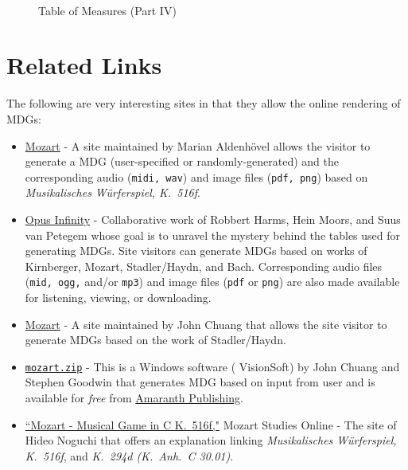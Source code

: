 \documentclass[letterpaper,x11names,svgnames,10pt]{article}
\begin{document}
\newpage
${}_{}$\\
\vspace{0.10in}
\begin{figure}[H]
	\centering
	\def\svgwidth{0.975\columnwidth}
	
	\caption{Table of Measures (Part IV)}
	\label{fig:meas4}
\end{figure}


\newpage
\section{Related Links}
The following are very interesting sites in that they allow the online rendering of MDGs:
\begin{itemize}
	\item  \href{https://marian-aldenhoevel.de/mozart/}{Mozart} - A site maintained by Marian Aldenh\"{o}vel allows the visitor to generate a MDG (user-specified or randomly-generated) and the corresponding audio ({\tt midi, wav}) and image files ({\tt pdf, png}) based on {\em Musikalisches W\"{u}rferspiel, K.\ 516f}.
	
	\item \href{https://opus-infinity.org}{Opus Infinity} - Collaborative work of Robbert Harms, Hein Moors, and Suus van Petegem whose goal is to unravel the mystery behind the tables used for generating MDGs.  Site visitors can generate MDGs based on works of Kirnberger, Mozart, Stadler/Haydn, and Bach.  Corresponding audio files ({\tt mid, ogg,} and/or {\tt mp3}) and image files ({\tt pdf} or {\tt png}) are also made available for listening, viewing, or downloading.
	
	\item  \href{http://sunsite.univie.ac.at/Mozart/dice/}{Mozart} - A site maintained by John Chuang that allows the site visitor to generate MDGs based on the work of Stadler/Haydn.
 	
 	\item \href{https://www.amaranthpublishing.com/mozart.zip}{\tt mozart.zip} -  This is a Windows software ( VisionSoft) by John Chuang and Stephen Goodwin that generates MDG based on input from user and is available for {\it free} from  \href{http://www.amaranthpublishing.com/MozartDiceGame.htm}{Amaranth Publishing}.  
 	
 	\item \href{(http://www.asahi-net.or.jp/\~rb5h-ngc/e/k516f.htm}{``Mozart - Musical Game in C K.\ 516f,"}	Mozart Studies Online - The site of Hideo Noguchi that offers an explanation linking {\em Musikalisches W\"{u}rferspiel, K.\ 516f}, and  {\em K.\ 294d (K.\ Anh.\ C 30.01)}. 
\end{itemize}
\end{document}
